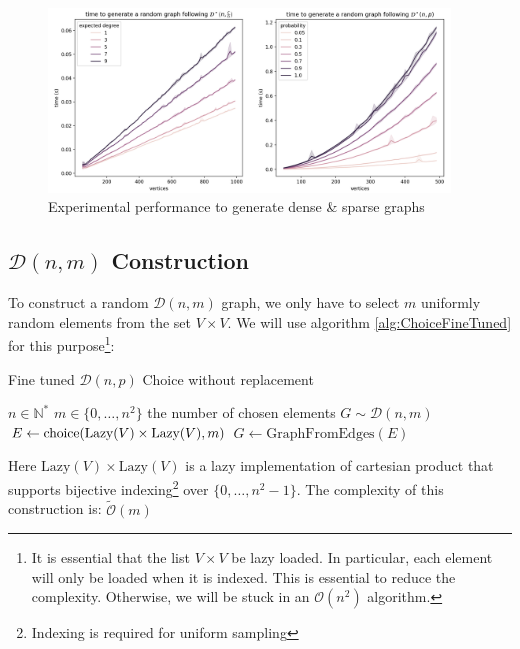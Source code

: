 \begin{figure}[H]
	\centering
	\includegraphics[width=0.95\textwidth]{Figures/GraphGen.png}
	\caption{Experimental performance to generate dense \& sparse graphs}
\end{figure}
\FloatBarrier

\subsection{$\mathcal{D}(n,m)$ Construction}
To construct a random $\mathcal{D}(n,m)$ graph, we only have to select $m$ uniformly random elements from the set $V\times V.$
\newline We will use algorithm \ref{alg:ChoiceFineTuned} for this purpose\footnote{It is essential that the list $V\times V$ be lazy loaded. In particular, each element will only be loaded when it is indexed. This is essential to reduce the complexity. Otherwise, we will be stuck in an $\mathcal{O}(n^2)$ algorithm.}:
\begin{algorithm}
	\caption{Fine tuned $\mathcal{D}(n,p)$ Choice without replacement }\label{Dnm} 
	\begin{algorithmic}
		\Require $n\in\mathbb{N}^*$
		\Require $m\in\{0,\dots,n^2\}$ the number of chosen elements
		\Ensure $G\sim \mathcal{D}(n,m)$
		\State $E\leftarrow \operatorname{choice}(\text{Lazy}(V)\times \text{Lazy}(V),m)$ 
		\State \Return $G\leftarrow \text{GraphFromEdges}(E)$
	\end{algorithmic}
\end{algorithm}
\FloatBarrier
Here $\text{Lazy}(V)\times \text{Lazy}(V)$ is a lazy implementation of cartesian product that supports bijective indexing\footnote{Indexing is required for uniform sampling} over $\{0,\dots,n^2-1\}.$
\newline The complexity of this construction is: $
\tilde{\mathcal{O}}(m)
$ 
\newpage
